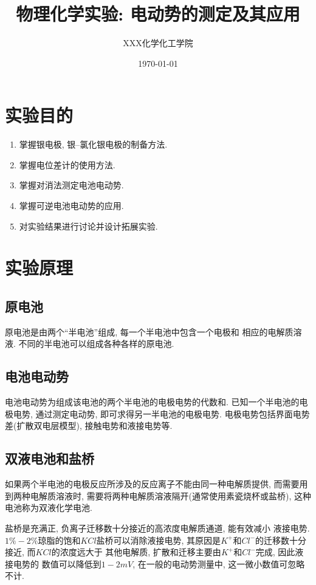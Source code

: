 \documentclass[a4paper]{article}
\title{物理化学实验: 电动势的测定及其应用}
\author{XXX\quad 123456789\quad 化学化工学院}
\date{\today}
\begin{document}
\maketitle
\section{实验目的}
\begin{enumerate}
\item 掌握银电极, 银--氯化银电极的制备方法.
\item 掌握电位差计的使用方法.
\item 掌握对消法测定电池电动势.
\item 掌握可逆电池电动势的应用.
\item 对实验结果进行讨论并设计拓展实验.
\end{enumerate}
\section{实验原理}
\subsection{原电池}
原电池是由两个``半电池''组成, 每一个半电池中包含一个电极和
相应的电解质溶液. 不同的半电池可以组成各种各样的原电池.
\par
\subsection{电池电动势}
电池电动势为组成该电池的两个半电池的电极电势的代数和. 
已知一个半电池的电极电势, 通过测定电动势, 即可求得另一半电池的电极电势.
电极电势包括界面电势差(扩散双电层模型), 接触电势和液接电势等.
\subsection{双液电池和盐桥}
如果两个半电池的电极反应所涉及的反应离子不能由同一种电解质提供, 
而需要用到两种电解质溶液时, 需要将两种电解质溶液隔开(通常使用素瓷烧杯或盐桥), 
这种电池称为双液化学电池.
\par 
盐桥是充满正, 负离子迁移数十分接近的高浓度电解质通道, 能有效减小
液接电势. $1\% - 2\%$琼脂的饱和$KCl$盐桥可以消除液接电势, 
其原因是$K^{+}$和$Cl^{-}$的迁移数十分接近, 而$KCl$的浓度远大于
其他电解质, 扩散和迁移主要由$K^{+}$和$Cl^{-}$完成, 因此液接电势的
数值可以降低到$1 - 2mV$, 在一般的电动势测量中, 这一微小数值可忽略不计.
\end{document}
